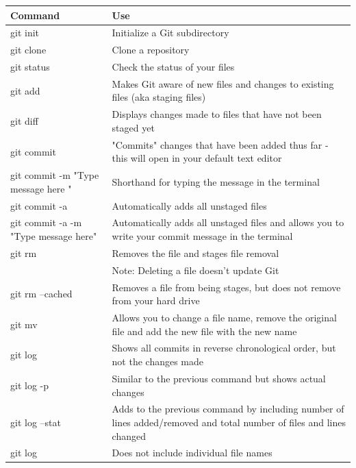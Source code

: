 \documentclass{article} %
\begin{document}
\begin{center}
    \begin{tabular}{ | l | p{7cm} |}
    \hline
    Command & Use \\ \hline
    git \color{blue}init & Initialize a Git subdirectory \\ 
    git \color{blue}clone & Clone a repository \\ 
    git \color{blue}status & Check the status of your files  \\
    
    git \color{blue}add & Makes Git aware of new files and changes to existing files (aka staging files)  \\
    
    git \color{blue}diff & Displays changes made to files that have not been staged yet  \\
    
    git \color{blue}commit & "Commits" changes that have been added thus far - this will open in your default text editor \\ 
    git \color{blue}commit -m "Type message here " & Shorthand for typing the message in the terminal \\ 
    git \color{blue} commit  -a & Automatically adds all unstaged files \\
    git \color{blue} commit -a -m "Type message here"  & Automatically adds all unstaged files and allows you to write your commit message in the terminal \\
    git \color{blue}rm  & Removes the file and stages file removal \\
    				& Note: Deleting a file doesn't update Git \\   
    git \color{blue}rm --cached & Removes a file from being stages, but does not remove from your hard drive\\ 
    git \color{blue}mv & Allows you to change a file name, remove the original file and add the new file with the new name \\ 
    git \color{blue}log & Shows all commits in reverse chronological order, but not the changes made \\
    git \color{blue}log -p & Similar to the previous command but shows actual changes \\
    git \color{blue}log --stat & Adds to the previous command by including number of lines added/removed and total number of files and lines changed \\
    git \color{blue}log & Does not include individual file names \\ 
    \end{tabular}
\end{center}
\end{document}
